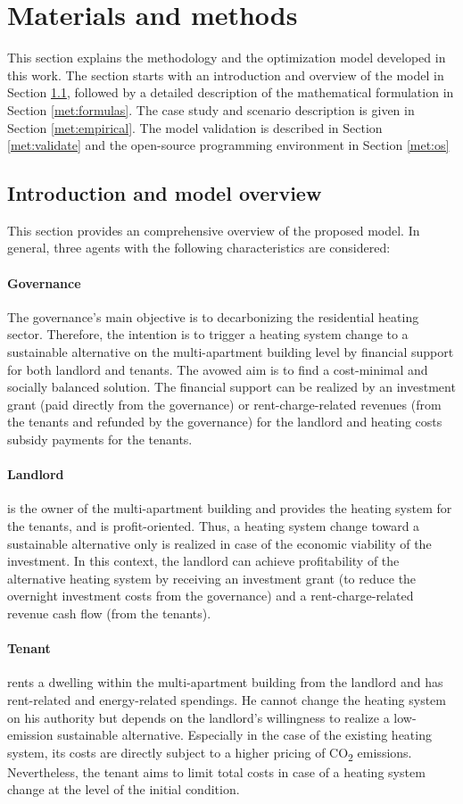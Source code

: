 \newpage
\section{Materials and methods}\label{methodology}
This section explains the methodology and the optimization model developed in this work. The section starts with an introduction and overview of the model in Section \ref{met:intro}, followed by a detailed description of the mathematical formulation in Section \ref{met:formulas}. The case study and scenario description is given in Section \ref{met:empirical}. The model validation is described in Section \ref{met:validate} and the open-source programming environment in Section \ref{met:os}

\subsection{Introduction and model overview}\label{met:intro}
This section provides an comprehensive overview of the proposed model. In general, three agents with the following characteristics are considered:
\paragraph{Governance} The governance's main objective is to decarbonizing the residential heating sector. Therefore, the intention is to trigger a heating system change to a sustainable alternative on the multi-apartment building level by financial support for both landlord and tenants. The avowed aim is to find a cost-minimal and socially balanced solution. The financial support can be realized by an investment grant (paid directly from the governance) or rent-charge-related revenues (from the tenants and refunded by the governance) for the landlord and heating costs subsidy payments for the tenants. 
\paragraph{Landlord} is the owner of the multi-apartment building and provides the heating system for the tenants, and is profit-oriented. Thus, a heating system change toward a sustainable alternative only is realized in case of the economic viability of the investment. In this context, the landlord can achieve profitability of the alternative heating system by receiving an investment grant (to reduce the overnight investment costs from the governance) and a rent-charge-related revenue cash flow (from the tenants). 
\paragraph{Tenant} rents a dwelling within the multi-apartment building from the landlord and has rent-related and energy-related spendings. He cannot change the heating system on his authority but depends on the landlord's willingness to realize a low-emission sustainable alternative. Especially in the case of the existing heating system, its costs are directly subject to a higher pricing of CO\textsubscript{2} emissions. Nevertheless, the tenant aims to limit total costs in case of a heating system change at the level of the initial condition.\vspace{0.5cm}


